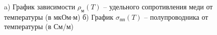\documentclass[a4paper, 14pt]{extarticle}%
\newcommand\ECaption[1]{%
     \captionsetup{font=footnotesize}%
     \caption{#1}}
\begin{document}
\begin{figure}[h!]
\begin{minipage}[h]{0.53\linewidth}
\end{minipage}
\hfill
\begin{minipage}[h]{0.53\linewidth}
\end{minipage}
\ECaption{a) График зависимости $\rho_{\text{м}}(T)$ -- удельного сопротивления меди от температуры (в мкОм$\cdot$м) б) График $\sigma_{\text{пп}}(T)$ -- полупроводника от температуры (в См/м)}
\end{figure}
\end{document}
